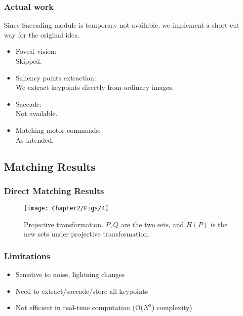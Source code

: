 \documentclass{beamer}
\begin{document}
\begin{frame}
\frametitle{Actual work}
Since Saccading module is temporary not available, we implement a short-cut way for the original idea.\\

\begin{itemize}
\item Foveal vision:\\	
Skipped.
\item Saliency points extraction:\\
We extract keypoints directly from ordinary images.
\item Saccade:\\
Not available.
\item Matching motor commands:\\
As intended. 
\end{itemize}
\end{frame}


\subsection{Matching Results}

\begin{frame}
\frametitle{Direct Matching Results}
\begin{figure}
\centering    
\texttt{[image: Chapter2/Figs/4]}
\caption{Projective transformation. $P,Q$ are the two sets, and $H(P)$ is the new sets under projective transformation.}
\label{fig:2.7}
\end{figure}%

\end{frame}

\begin{frame}
\frametitle{Limitations}
\begin{itemize}
\item Sensitive to noise, lightning changes
\item Need to extract/saccade/store all keypoints
\item Not efficient in real-time computation (O($N^2$) complexity) 
\end{itemize}
\end{frame}
\end{document}

